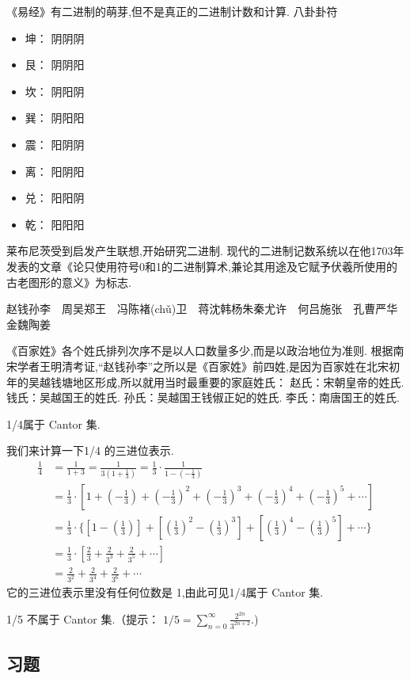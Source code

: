 \documentclass[main.tex]{subfiles}
\begin{document}
《易经》有二进制的萌芽,但不是真正的二进制计数和计算.
八卦卦符
\begin{itemize}
\item 坤： 阴阴阴
\item 艮： 阴阴阳
\item 坎： 阴阳阴
\item 巽： 阴阳阳
\item 震： 阳阴阴
\item 离： 阳阴阳
\item 兑： 阳阳阴
\item 乾： 阳阳阳
\end{itemize}

莱布尼茨受到启发产生联想,开始研究二进制.
现代的二进制记数系统以在他1703年发表的文章《论只使用符号0和1的二进制算术,兼论其用途及它赋予伏羲所使用的古老图形的意义》为标志.



赵钱孙李　周吴郑王　冯陈褚(chǔ)卫　蒋沈韩杨朱秦尤许　何吕施张　孔曹严华　金魏陶姜

《百家姓》各个姓氏排列次序不是以人口数量多少,而是以政治地位为准则.
根据南宋学者王明清考证,“赵钱孙李”之所以是《百家姓》前四姓,是因为百家姓在北宋初年的吴越钱塘地区形成,所以就用当时最重要的家庭姓氏：
赵氏：宋朝皇帝的姓氏.
钱氏：吴越国王的姓氏.
孙氏：吴越国王钱俶正妃的姓氏.
李氏：南唐国王的姓氏.

\begin{example}
	1/4属于 Cantor 集.
\end{example}
我们来计算一下1/4 的三进位表示.
\begin{align*}
\frac{1}{4} &= \frac{1}{1+3} = \frac{1}{3(1+ \frac{1}{3})} 
  = \frac{1}{3} \cdot \frac{1}{1 - (- \frac{1}{3})} \\
  &	= \frac{1}{3} \cdot \left[ 
1 + \left(- \frac{1}{3}\right)
+  \left(- \frac{1}{3}\right)^2 + \left(- \frac{1}{3}\right)^3 
+ \left(- \frac{1}{3}\right)^4   +\left(- \frac{1}{3}\right)^5  +\cdots\right] \\
  &	= \frac{1}{3} \cdot\Big\{ \left[ 
1 - \left( \frac{1}{3}\right)\right]
+ \left[  \left(\frac{1}{3}\right)^2 - \left(\frac{1}{3}\right)^3 \right]
+ \left[ \left(\frac{1}{3}\right)^4   -\left(\frac{1}{3}\right)^5 \right] +\cdots\Big\}\\
  &	= \frac{1}{3} \cdot \left[ 
 \frac{2}{3}+ \frac{2}{3^3}+ \frac{2}{3^5}+\cdots\right] \\
&=  \frac{2}{3^2}+ \frac{2}{3^4}+ \frac{2}{3^6}+\cdots
\end{align*}
\noindent
它的三进位表示里没有任何位数是 1,由此可见1/4属于 Cantor 集.

\begin{Exercises}
	
	\item 1/5 不属于 Cantor 集.（提示：
	$1/5 = \sum_{n = 0}^\infty\frac{2^{2n}}{3^{2n+2}}$.)
	
	
\end{Exercises}
\subsection*{习题}
\end{document}
